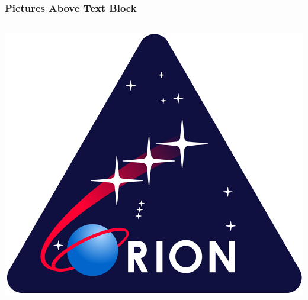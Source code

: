   \begin{frame}\frametitle{Pictures Above Text Block}


    \begin{columns}[t]



    \begin{center}
      \includegraphics[trim=0 0 0 0, clip, width=1.0\textwidth]{Images/Orion_logo.png}
      \end{center}






\end{columns}
\end{frame}
